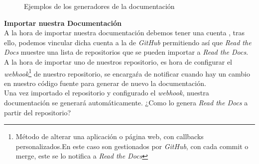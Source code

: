 \documentclass[a4paper, 12pt]{book}
\begin{document}
\begin{figure}[H]
    \centering
    \caption{Ejemplos de los generadores de la documentación}
\end{figure}
\textbf{Importar nuestra Documentación}\\
A la hora de importar nuestra documentación debemos tener una cuenta , tras ello, podemos vincular dicha cuenta a la de \emph{GitHub} permitiendo así que \emph{Read the Docs} muestre una lista de repositorios que se pueden importar a \emph{Read the Docs}. A la hora de importar uno de nuestros repositorio, es hora de configurar el \emph{webhook}\footnote{Método de alterar una aplicación o página web, con callbacks personalizados.En este caso son gestionados por \emph{GitHub}, con cada commit o merge, este se lo notifica a \emph{Read the Docs}} de nuestro repositorio, se encargaŕa de notificar cuando hay un cambio en nuestro código fuente para generar de nuevo la documentación.\\
Una vez importado el repositorio y configurado el \emph{webhook}, nuestra documentación se generará automáticamente. ¿Como lo genera \emph{Read the Docs} a partir del repositorio?\\
\end{document}
